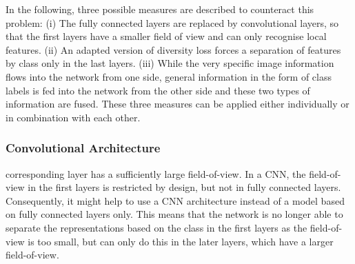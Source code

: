 In the following, three possible measures are described to counteract this problem: (i) The fully connected layers are replaced by convolutional layers, so that the first layers have a smaller field of view and can only recognise local features. (ii) An adapted version of diversity loss forces a separation of features by class only in the last layers. (iii) While the very specific image information flows into the network from one side, general information in the form of class labels is fed into the network from the other side and these two types of information are fused. These three measures can be applied either individually or in combination with each other.

\subsubsection{Convolutional Architecture}
corresponding layer has a sufficiently large field-of-view. In a CNN, the field-of-view in the first layers is restricted by design, but not in fully connected layers. Consequently, it might help to use a CNN architecture instead of a model based on fully connected layers only. This means that the network is no longer able to separate the representations based on the class in the first layers as the field-of-view is too small, but can only do this in the later layers, which have a larger field-of-view.



